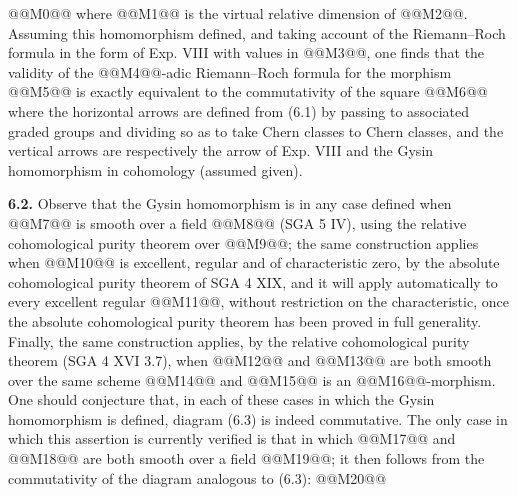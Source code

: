 @@M0@@
where @@M1@@ is the virtual relative dimension of @@M2@@. Assuming this homomorphism defined, and taking account of the Riemann--Roch formula in the form of Exp. VIII with values in @@M3@@, one finds that the validity of the @@M4@@-adic Riemann--Roch formula for the morphism @@M5@@ is exactly equivalent to the commutativity of the square
@@M6@@
where the horizontal arrows are defined from (6.1) by passing to associated graded groups and dividing so as to take Chern classes to Chern classes, and the vertical arrows are respectively the arrow of Exp. VIII and the Gysin homomorphism in cohomology (assumed given).

\textbf{6.2.} Observe that the Gysin homomorphism is in any case defined when @@M7@@ is smooth over a field @@M8@@ (SGA 5 IV), using the relative cohomological purity theorem over @@M9@@; the same construction applies when @@M10@@ is excellent, regular and of characteristic zero, by the absolute cohomological purity theorem of SGA 4 XIX, and it will apply automatically to every excellent regular @@M11@@, without restriction on the characteristic, once the absolute cohomological purity theorem has been proved in full generality. Finally, the same construction applies, by the relative cohomological purity theorem (SGA 4 XVI 3.7), when @@M12@@ and @@M13@@ are both smooth over the same scheme @@M14@@ and @@M15@@ is an @@M16@@-morphism. One should conjecture that, in each of these cases in which the Gysin homomorphism is defined, diagram (6.3) is indeed commutative. The only case in which this assertion is currently verified is that in which @@M17@@ and @@M18@@ are both smooth over a field @@M19@@; it then follows from the commutativity of the diagram analogous to (6.3):
@@M20@@
